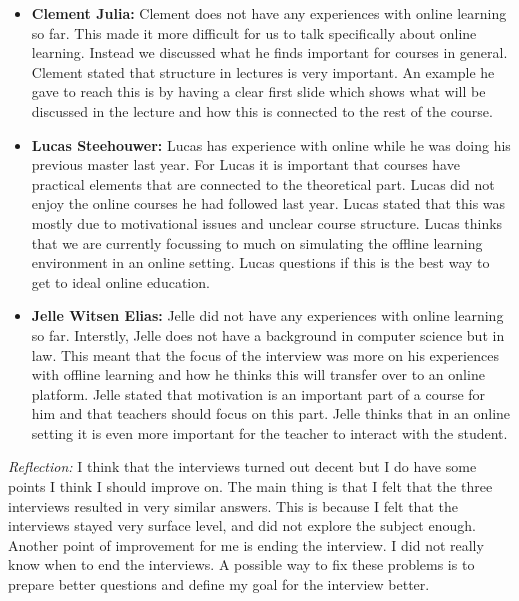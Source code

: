 \documentclass[]{article}
\begin{document}
\begin{itemize}
    \item[] \textbf{Clement Julia: }  
    Clement does not have any experiences with online learning so far. 
    This made it more difficult for us to talk specifically about online learning. 
    Instead we discussed what he finds important for courses in general. 
    Clement stated that structure in lectures is very important. 
    An example he gave to reach this is by having a clear first slide which shows 
    what will be discussed in the lecture and how this is connected to the rest of the course. 
    \item[] \textbf{Lucas Steehouwer: } 
    Lucas has experience with online while he was doing his previous master last year. 
    For Lucas it is important that courses have practical elements that are connected to the theoretical part. 
    Lucas did not enjoy the online courses he had followed last year. 
    Lucas stated that this was mostly due to motivational issues and unclear course structure. 
    Lucas thinks that we are currently focussing to much on simulating the offline learning 
    environment in an online setting. Lucas questions if this is the best way to get to ideal online education.
    \item[] \textbf{Jelle Witsen Elias: } 
    Jelle did not have any experiences with online learning so far. 
    Interstly, Jelle does not have a background in computer science but in law.
    This meant that the focus of the interview was more on his experiences with
    offline learning and how he thinks this will transfer over to an online platform.
    Jelle stated that motivation is an important part of a course for him and 
    that teachers should focus on this part. Jelle thinks that in an online 
    setting it is even more important for the teacher to interact with the student. 
\end{itemize} 
\textit{Reflection:} I think that the interviews turned out decent but 
I do have some points I think I should improve on. The main thing is that I felt 
that the three interviews resulted in very similar answers. This is because I 
felt that the interviews stayed very surface level, and did not explore the 
subject enough. Another point of improvement for me is ending the interview.
I did not really know when to end the interviews. A possible way to fix these 
problems is to prepare better questions and define my goal for the interview better. 
\end{document}
